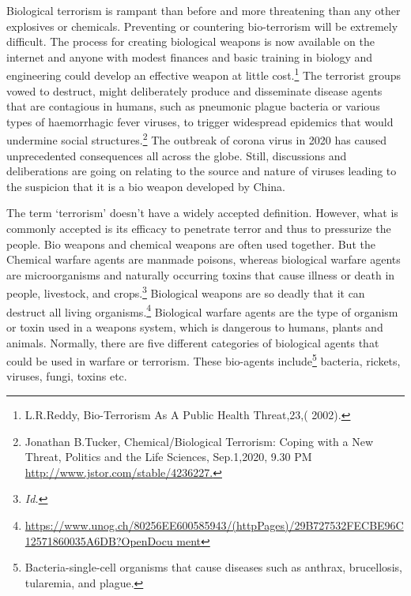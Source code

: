 \begin{multicols}{2}
\noi
Biological terrorism is rampant than before and more threatening than any other explosives or
chemicals. Preventing or countering bio-terrorism will be extremely difficult. The process for
creating biological weapons is now available on the internet and anyone with modest finances
and basic training in biology and engineering could develop an effective weapon at little
cost.\footnote{L.R.Reddy, Bio-Terrorism As A Public Health Threat,23,( 2002).}  The terrorist groups vowed to destruct, might deliberately produce and disseminate
disease agents that are contagious in humans, such as pneumonic plague bacteria or various
types of haemorrhagic fever viruses, to trigger widespread epidemics that would undermine
social structures.\footnote{Jonathan B.Tucker, Chemical/Biological Terrorism: Coping with a New Threat, Politics and the Life Sciences, Sep.1,2020, 9.30 PM \url{http://www.jstor.com/stable/4236227.}}  The outbreak of corona virus in 2020 has caused unprecedented
consequences all across the globe. Still, discussions and deliberations are going on relating to
the source and nature of viruses leading to the suspicion that it is a bio weapon developed by
China.


\noi
The term ‘terrorism’ doesn’t have a widely accepted definition. However, what is commonly
accepted is its efficacy to penetrate terror and thus to pressurize the people. Bio weapons and
chemical weapons are often used together. But the Chemical warfare agents are manmade
poisons, whereas biological warfare agents are microorganisms and naturally occurring
toxins that cause illness or death in people, livestock, and crops.\footnote{\textit{Id.}}  Biological weapons are so
deadly that it can destruct all living organisms.\footnote{\url{https://www.unog.ch/80256EE600585943/(httpPages)/29B727532FECBE96C12571860035A6DB?OpenDocu
ment}}  Biological warfare agents are the type of
organism or toxin used in a weapons system, which is dangerous to humans, plants and
animals. Normally, there are five different categories of biological agents that could be used
in warfare or terrorism. These bio-agents include\footnote{Bacteria-single-cell organisms that cause diseases such as anthrax, brucellosis, tularemia, and plague.} bacteria, rickets, viruses, fungi, toxins
etc. 


\end{multicols}
